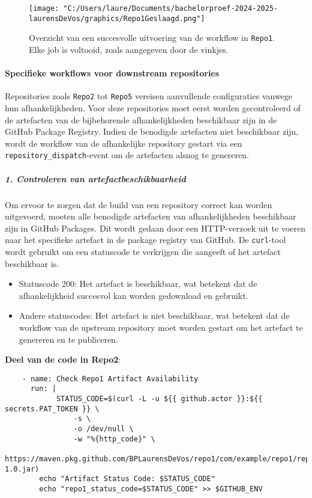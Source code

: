 \begin{figure}[h!]
    \centering
    \texttt{[image: "C:/Users/laure/Documents/bachelorproef-2024-2025-laurensDeVos/graphics/Repo1Geslaagd.png"]}
    \caption{Overzicht van een succesvolle uitvoering van de workflow in \texttt{Repo1}. Elke job is voltooid, zoals aangegeven door de vinkjes.}
\end{figure}

\paragraph{Specifieke workflows voor downstream repositories}
Repositories zoals \texttt{Repo2} tot \texttt{Repo5} vereisen aanvullende configuraties vanwege hun afhankelijkheden. Voor deze repositories moet eerst worden gecontroleerd of de artefacten van de bijbehorende afhankelijkheden beschikbaar zijn in de GitHub Package Registry. Indien de benodigde artefacten niet beschikbaar zijn, wordt de workflow van de afhankelijke repository gestart via een \texttt{repository\_dispatch}-event om de artefacten alsnog te genereren.

\subparagraph{1. Controleren van artefactbeschikbaarheid}
Om ervoor te zorgen dat de build van een repository correct kan worden uitgevoerd, moeten alle benodigde artefacten van afhankelijkheden beschikbaar zijn in GitHub Packages. Dit wordt gedaan door een HTTP-verzoek uit te voeren naar het specifieke artefact in de package registry van GitHub. De \texttt{curl}-tool wordt gebruikt om een statuscode te verkrijgen die aangeeft of het artefact beschikbaar is.

\begin{itemize} 
    \item Statuscode 200: Het artefact is beschikbaar, wat betekent dat de afhankelijkheid succesvol kan worden gedownload en gebruikt. \item Andere statuscodes: Het artefact is niet beschikbaar, wat betekent dat de workflow van de upstream repository moet worden gestart om het artefact te genereren en te publiceren. 
\end{itemize}

\textbf{Deel van de code in Repo2}:

\begin{verbatim}
    - name: Check Repo1 Artifact Availability
      run: |
            STATUS_CODE=$(curl -L -u ${{ github.actor }}:${{ secrets.PAT_TOKEN }} \
                -s \
                -o /dev/null \
                -w "%{http_code}" \
                https://maven.pkg.github.com/BPLaurensDeVos/repo1/com/example/repo1/repo1/1.0/repo1-1.0.jar)
        echo "Artifact Status Code: $STATUS_CODE"
        echo "repo1_status_code=$STATUS_CODE" >> $GITHUB_ENV
\end{verbatim}

